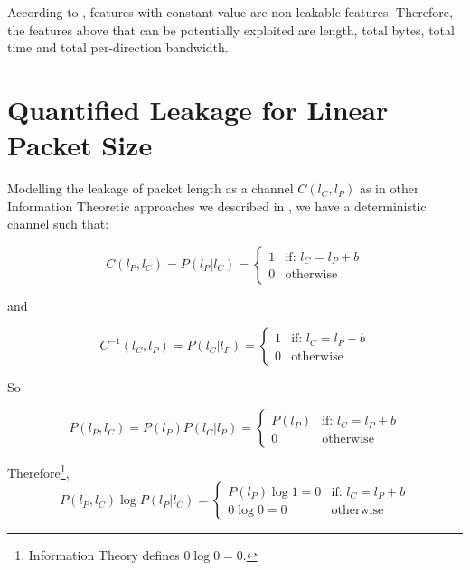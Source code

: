 According to , features with constant value are non leakable features. Therefore, the features above that can be potentially exploited are length, total bytes, total time and total per-direction bandwidth.

\chapter{Quantified Leakage for Linear Packet Size} \label{Linear Leakage}

Modelling the leakage of packet length as a channel $C(l_{C},l_{P})$ as in other Information Theoretic approaches we described in , we have a deterministic channel such that:

\begin{equation}
	C(l_{P}, l_{C}) = P(l_{P} | l_{C}) = 
	\begin{cases}
		1 &\text{if: } l_{C} = l_{P} + b \\
		0 &\text{otherwise}
	\end{cases}
\end{equation}

and

\begin{equation}
	C^{-1}(l_{C}, l_{P}) = P(l_{C} | l_{P}) = 
	\begin{cases}
		1 &\text{if: } l_{C} = l_{P} + b \\
		0 &\text{otherwise}
	\end{cases}
\end{equation}

So

\begin{equation}
	P(l_{P} , l_{C}) = P(l_{P}) P(l_{C} | l_{P}) =
	\begin{cases}
		P(l_{P}) &\text{if: } l_{C} = l_{P} + b \\
		0 &\text{otherwise}
	\end{cases}
\end{equation}

Therefore\footnote{Information Theory defines $0\log{0} = 0$.},
\begin{equation}
	P(l_{P} , l_{C}) \log{P(l_{P} | l_{C})} = 
	\begin{cases}
		P(l_{P})\log{1} = 0 &\text{if: } l_{C} = l_{P} + b \\
		0 \log{0} = 0 &\text{otherwise}
	\end{cases}
\end{equation}

